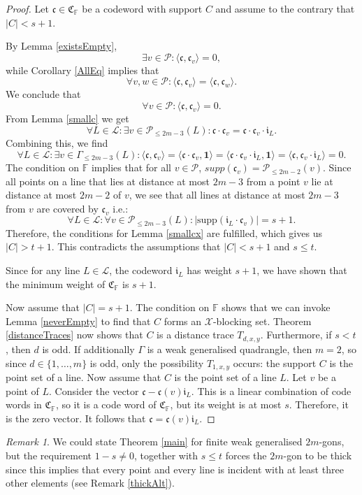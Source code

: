 \documentclass[12pt]{article}
\newcommand{\F}{\mathbb{F}}
\newcommand{\Points}{\mathcal{P}}
\newcommand{\Lines}{\mathcal{L}}
\newcommand{\Code}{\mathfrak{C}_\F}
\renewcommand{\i}{\mathfrak{i}}
\renewcommand{\c}{\mathfrak{c}}
\newcommand{\cv}{\mathfrak{c}_{v}}
\theoremstyle{remark}
\newtheorem{remark}{Remark}
\begin{document}
\begin{proof}
	Let \(\mathfrak{c}\in\Code\)  be a codeword with support $C$ and assume to the contrary that $|C|<s
    +1$. 
	
	By Lemma \ref{existsEmpty}, 
	\[\exists v \in \Points: \langle \c, \cv \rangle = 0,\]
	while Corollary \ref{AllEq} implies that 
	\[\forall v, w \in \Points: \langle \c, \cv \rangle = \langle \c, \c_w\rangle. \]
	We conclude that
	\[\forall v\in \Points: \langle \c, \cv\rangle = 0.\]
	From Lemma \ref{smallc} we get
	\[\forall L \in \Lines:\exists v \in \Points_{\le2m-3}(L): \c\cdot\cv = \c\cdot\cv\cdot\i_L.\]
	Combining this, we find 
	\[\forall L \in \Lines:\exists v \in \Gamma_{\le2m-3}(L): \langle \c,\cv\rangle = \langle \c\cdot \cv, \mathbf{1} \rangle = \langle \c\cdot \cv\cdot \i_L, \mathbf{1} \rangle = \langle \c,\cv\cdot \i_L\rangle = 0.\]
	The condition on \(\F\) implies that for all $v\in \Points$, $supp(\cv)=\Points_{\leq 2m-2}(v)$. Since all points on a line that lies at distance at most $2m-3$ from a point $v$ lie at distance at most $2m-2$ of $v$, we see that all lines at distance at most \(2m-3\) from \(v\) are covered by \(\cv\) i.e.:
	\[\forall L\in \Lines: \forall v \in \Points_{\le 2m-3}(L): |\text{supp}(\i_L\cdot\cv)| = s+1.\]
	Therefore, the conditions for Lemma \ref{smallcx} are fulfilled, which gives us \(|C|>t+1\). This contradicts the assumptions that $|C|<s+1$ and \(s\le t\).
	
	Since for any line \(L\in \Lines\), the codeword \(\mathfrak{i}_L\) has weight \(s+1\), we have shown that the minimum weight of $\Code$ is $s+1$.

    Now assume that $|C|=s+1$. The condition on $\F$ shows that we can invoke Lemma \ref{neverEmpty} to find that $C$ forms an $\mathcal{X}$-blocking set.  Theorem \ref{distanceTraces} now shows that $C$ is a distance trace $T_{d,x,y}$. Furthermore, if $s<t$, then $d$ is odd. If additionally $\Gamma$ is a weak generalised quadrangle, then $m=2$, so since $d\in \{1,\ldots,m\}$ is odd, only the possibility $T_{1,x,y}$ occurs: the support $C$ is the point set of a line. 
    Now assume that $C$ is the point set of a line $L$. Let $v$ be a point of $L$. Consider the vector $\c-\c(v)\mathfrak{i}_L$. This is a linear combination of code words in $\Code$, so it is a code word of $\Code$, but its weight is at most $s$. Therefore, it is the zero vector. It follows that $\c=\c(v)\mathfrak{i}_L$. 
\end{proof}

\begin{remark}
	We could state Theorem \ref{main} for finite weak generalised \(2m\)-gons, but the requirement \(1-s\neq 0\), together with \(s\le t\) forces the \(2m\)-gon to be thick since this implies that every point and every line is incident with at least three other elements (see Remark \ref{thickAlt}).
\end{remark}
\end{document}

